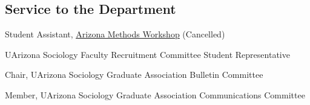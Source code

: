 \subsection*{Service to the Department}

Student Assistant, \href{https://sociology.arizona.edu/methods}
{\underline{Arizona Methods Workshop}}  (Cancelled) 


UArizona Sociology Faculty Recruitment Committee Student Representative

 Chair,
UArizona Sociology Graduate Association Bulletin Committee

Member,
UArizona Sociology Graduate Association Communications Committee 